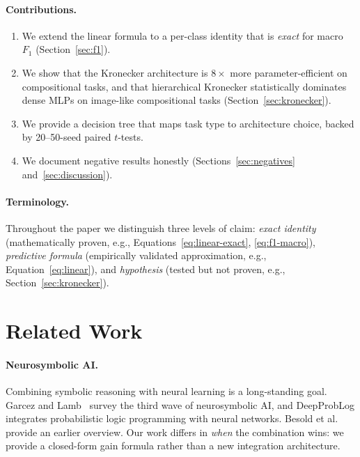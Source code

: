 \documentclass[11pt,a4paper]{article}
\begin{document}
\paragraph{Contributions.}
\begin{enumerate}
\item We extend the linear formula to a per-class identity that is
\emph{exact} for macro $F_1$ (Section~\ref{sec:f1}).
\item We show that the Kronecker architecture is $8\times$ more
parameter-efficient on compositional tasks, and that hierarchical
Kronecker statistically dominates dense MLPs on image-like compositional
tasks (Section~\ref{sec:kronecker}).
\item We provide a decision tree that maps task type to architecture
choice, backed by 20--50-seed paired $t$-tests.
\item We document negative results honestly (Sections~\ref{sec:negatives}
and~\ref{sec:discussion}).
\end{enumerate}

\paragraph{Terminology.}
Throughout the paper we distinguish three levels of claim:
\emph{exact identity} (mathematically proven, e.g.,
Equations~\ref{eq:linear-exact}, \ref{eq:f1-macro}),
\emph{predictive formula} (empirically validated approximation,
e.g., Equation~\ref{eq:linear}), and
\emph{hypothesis} (tested but not proven, e.g.,
Section~\ref{sec:kronecker}).


\section{Related Work}
\label{sec:related}

\paragraph{Neurosymbolic AI.}
Combining symbolic reasoning with neural learning is a long-standing
goal. Garcez and Lamb~\cite{garcez2023neurosymbolic} survey the
third wave of neurosymbolic AI, and DeepProbLog
\cite{manhaeve2018deepproblog} integrates probabilistic logic
programming with neural networks. Besold et al.~\cite{besold2017neural}
provide an earlier overview. Our work differs in \emph{when} the
combination wins: we provide a closed-form gain formula rather than
a new integration architecture.
\end{document}
